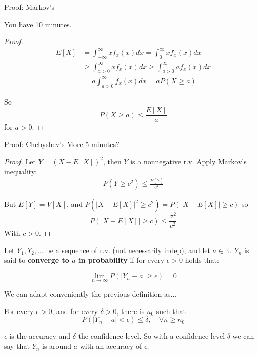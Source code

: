 \documentclass[aspectratio=169]{beamer}
\begin{document}
\begin{frame}{Proof: Markov's}
    
    You have 10 minutes. \pause
    
    \begin{proof}
        
        \begin{align*}
            E[X] &= \int_{-\infty}^{\infty} x f_x(x)dx = \int_{0}^{\infty} xf_x(x)dx\\
            &\geq \int_{a>0}^\infty xf_x(x)dx\geq \int_{a>0}^\infty af_x(x)dx\\
            &= a\int_{a>0}^\infty f_x(x)dx = a P(X\geq a)
        \end{align*}
        
        So $$P(X\geq a) \leq \frac{E[X]}{a}$$ for $a>0$.
        
    \end{proof}
    
\end{frame}

\begin{frame}{Proof: Chebyshev's}
    More 5 minutes?\pause
    
    \begin{proof}
    
        Let $Y=(X-E[X])^2$, then $Y$ is a nonnegative r.v. Apply Markov's inequality:
        \begin{align*}
            P(Y\geq c^2) \leq \frac{E[Y]}{c^2}
        \end{align*}
    
        But $E[Y]= V[X]$, and $P(|X-E[X]|^2\geq c^2) = P(|X-E[X]|\geq c)$ so $$ P(|X-E[X]|\geq c) \leq \frac{\sigma^2}{c^2}$$
        With $c>0$.
    \end{proof}
    
\end{frame}

\begin{frame}
    \begin{definition}
        Let $Y_1, Y_2,...$ be a sequence of r.v. (not necessarily indep), and let $a\in\mathbb{R}$. $Y_n$ is said to \textbf{converge to $a$ in probability} if for every $\epsilon>0$ holds that:
        
        $$\lim_{n\rightarrow \infty} P(|Y_n-a|\geq \epsilon)=0$$
    \end{definition}
    \vspace{0.2cm}
    
    We can adapt conveniently the previous definition as...
    
    For every $\epsilon>0$, and for every $\delta>0$, there is $n_0$ such that $$P(|Y_n-a|<\epsilon)\leq \delta,\quad \forall n\geq n_0$$
    
    $\epsilon$ is the accuracy and $\delta$ the confidence level. So with a confidence level $\delta$ we can say that $Y_n$ is around $a$ with an accuracy of $\epsilon$.
\end{frame}
\end{document}
